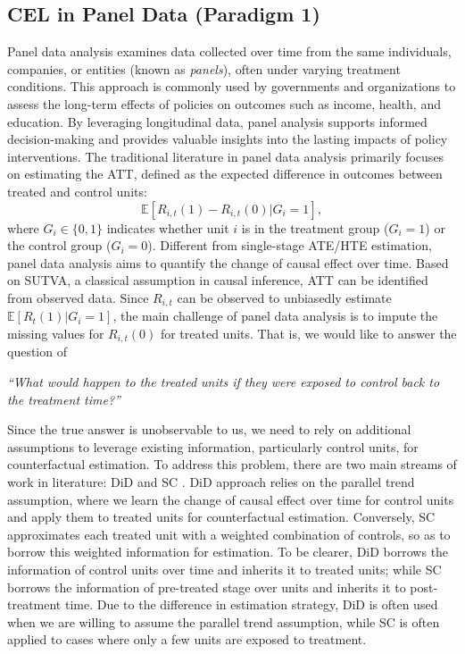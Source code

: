 \subsection{\acrshort{CEL} in Panel Data (Paradigm 1)}\label{sec:CEL_p3}
Panel data analysis examines data collected over time from the same individuals, companies, or entities (known as \textit{panels}), often under varying treatment conditions. This approach is commonly used by governments and organizations to assess the long-term effects of policies on outcomes such as income, health, and education. By leveraging longitudinal data, panel analysis supports informed decision-making and provides valuable insights into the lasting impacts of policy interventions. The traditional literature in panel data analysis primarily focuses on estimating the \acrfull{ATT}, defined as the expected difference in outcomes between treated and control units:
\begin{equation}
\mathbb{E}[R_{i,t}(1)-R_{i,t}(0)|G_i =1],
\end{equation}
where $G_i \in \{0,1\}$ indicates whether unit $i$ is in the treatment group ($G_i=1$) or the control group ($G_i=0$). Different from single-stage \acrshort{ATE}/\acrshort{HTE} estimation, panel data analysis aims to quantify the change of causal effect over time. Based on SUTVA, a classical assumption in causal inference, \acrshort{ATT} can be identified from observed data. Since $R_{i,t}$ can be observed to unbiasedly estimate $\mathbb{E}[R_{t}(1)|G_i=1]$, the main challenge of panel data analysis is to impute the missing values for $R_{i,t}(0)$ for treated units. That is, we would like to answer the question of 

\textit{``What would happen to the treated units if they were exposed to control back to the treatment time?”}

Since the true answer is unobservable to us, we need to rely on additional assumptions to leverage existing information, particularly control units, for counterfactual estimation. 
To address this problem, there are two main streams of work in literature: \acrfull{DiD} \citep{lechner2011estimation} and \acrfull{SC} \citep{abadie2003economic, li2020statistical}. \acrshort{DiD} approach relies on the parallel trend assumption, where we learn the change of causal effect over time for control units and apply them to treated units for counterfactual estimation. Conversely, \acrshort{SC} approximates each treated unit with a weighted combination of controls, so as to borrow this weighted information for estimation. To be clearer, \acrshort{DiD} borrows the information of control units over time and inherits it to treated units; while \acrshort{SC} borrows the information of pre-treated stage over units and inherits it to post-treatment time. Due to the difference in estimation strategy, \acrshort{DiD} is often used when we are willing to assume the parallel trend assumption, while \acrshort{SC} is often applied to cases where only a few units are exposed to treatment.

